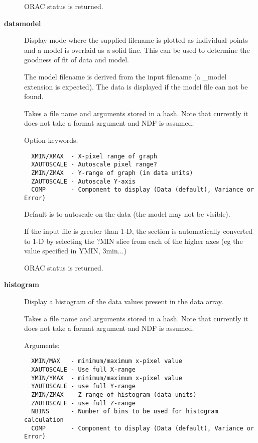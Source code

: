 \begin{description}
ORAC status is returned.


\item[{\textbf{datamodel}}] \mbox{}

Display mode where the supplied filename is plotted as individual
points and a model is overlaid as a solid line. This can be used
to determine the goodness of fit of data and model.



The model filename is derived from the input filename (a \_model
extension is expected). The data is displayed if the model
file can not be found.



Takes a file name and arguments stored in a hash.
Note that currently it does not take a format argument
and NDF is assumed.



Option keywords:

\begin{verbatim}
  XMIN/XMAX  - X-pixel range of graph
  XAUTOSCALE - Autoscale pixel range?
  ZMIN/ZMAX  - Y-range of graph (in data units)
  ZAUTOSCALE - Autoscale Y-axis
  COMP       - Component to display (Data (default), Variance or Error)
\end{verbatim}


Default is to autoscale on the data (the model may not be visible).



If the input file is greater than 1-D, the section is automatically
converted to 1-D by selecting the ?MIN slice from each of the
higher axes (eg the value specified in YMIN, 3min...)



ORAC status is returned.


\item[{\textbf{histogram}}] \mbox{}

Display a histogram of the data values present in the 
data array.



Takes a file name and arguments stored in a hash.
Note that currently it does not take a format argument
and NDF is assumed.



Arguments:

\begin{verbatim}
  XMIN/MAX   - minimum/maximum x-pixel value
  XAUTOSCALE - Use full X-range
  YMIN/YMAX  - minimum/maximum x-pixel value
  YAUTOSCALE - use full Y-range
  ZMIN/ZMAX  - Z range of histogram (data units)
  ZAUTOSCALE - use full Z-range
  NBINS      - Number of bins to be used for histogram calculation
  COMP       - Component to display (Data (default), Variance or Error)
\end{verbatim}



\end{description}
